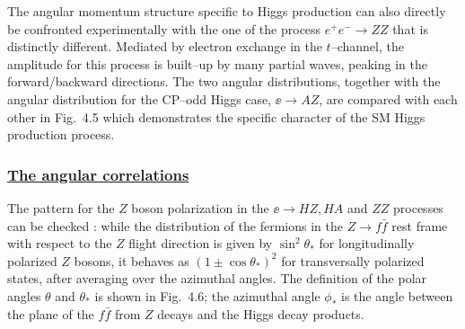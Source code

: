 \begin{figure}[!h]
\begin{center}
\vspace*{-2.2cm}
\hspace*{-1.cm}
\end{center}
\vspace*{-13.cm}
\end{figure}

The angular momentum structure specific to Higgs production can also directly
be  confronted experimentally with the one of the process $e^+e^- \rightarrow  
ZZ$ that is distinctly different. Mediated by electron exchange in the
$t$--channel, the amplitude for this process is built--up by many partial waves,
peaking in the forward/backward directions. The two angular distributions, 
together with the angular distribution for the CP--odd Higgs case, $\ee \to AZ$,
are compared with each other in Fig.~4.5 which demonstrates the specific 
character of the SM Higgs production process. 

\subsubsection*{\underline{The angular correlations}}

The pattern for the $Z$ boson polarization in the $\ee \to HZ,HA$ and $ZZ$ 
processes can be checked \cite{Bargeretal,ee-HZ-stong}: while the distribution 
of the fermions in the $Z 
\to  f\bar{f}$ rest frame with respect to the $Z$ flight direction is given by 
$\sin^2\theta_*$ for longitudinally polarized $Z$ bosons, it behaves as 
$(1\pm \cos\theta_*)^2$ for transversally polarized states, after averaging 
over the azimuthal angles. The definition of the polar angles  $\theta$ and 
$\theta_*$ is shown in Fig.~4.6; the azimuthal angle $\phi_*$ is the angle 
between the plane of the $f\bar{f}$ from $Z$ decays and the Higgs decay 
products. \s

